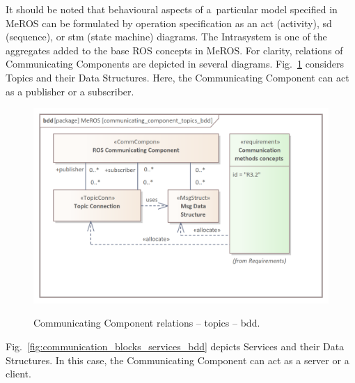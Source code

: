 \documentclass{ieeeaccess}
\begin{document}
	It should be noted that behavioural aspects of a~particular model specified in MeROS can be formulated by operation specification as an act (activity), sd (sequence), or stm (state machine) diagrams. The Intrasystem is one of the aggregates added to the base ROS concepts in MeROS. 
	For clarity, relations of Communicating Components are depicted in several diagrams. Fig.~\ref{fig:communicating_component_topics_bdd} considers Topics and their Data Structures. Here, the Communicating Component can act as a publisher or a subscriber.	
	 
	\begin{figure}[htb]
		\centering
		\begin{center}
			{\includegraphics[scale=0.7]{img/meros_pkg/communicating_component_topics_bdd.png}}
		\end{center}
		\caption{Communicating Component relations -- topics -- bdd.} 
		\label{fig:communicating_component_topics_bdd}
	\end{figure}
	
	Fig.~\ref{fig:communication_blocks_services_bdd} depicts Services and their Data Structures. In this case, the Communicating Component can act as a server or a client.	
	
\end{document}
